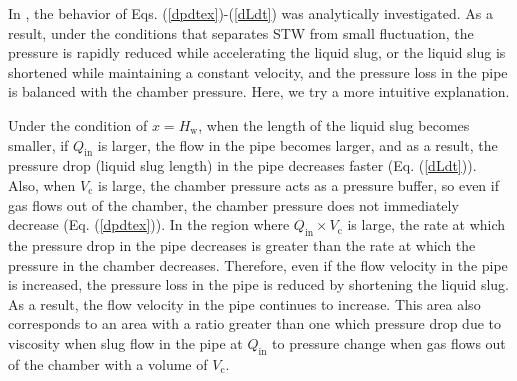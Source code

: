 \documentclass[aps,pre,preprint,groupedaddress,showkeys]{revtex4-2}
\begin{document}
In \cite{kanno2018}, the behavior of Eqs. (\ref{dpdtex})-(\ref{dLdt}) was analytically investigated.
As a result, under the conditions that separates STW from small fluctuation, the pressure is rapidly reduced while accelerating the liquid slug, or the liquid slug is shortened while maintaining a constant velocity, and the pressure loss in the pipe is balanced with the chamber pressure.
Here, we try a more intuitive explanation.

Under the condition of $ x = H_ \mathrm{w}$, when the length of the liquid slug becomes smaller, if $ Q_ \mathrm {in}$ is larger, the flow in the pipe becomes larger, and as a result, the pressure drop (liquid slug length) in the pipe decreases faster (Eq. (\ref{dLdt})).
Also, when $ V_ \mathrm{c} $ is large, the chamber pressure acts as a pressure buffer, so even if gas flows out of the chamber, the chamber pressure does not immediately decrease (Eq. (\ref{dpdtex})).
In the region where $ Q_ \mathrm{in} \times V_ \mathrm {c} $ is large, the rate at which the pressure drop in the pipe decreases is greater than the rate at which the pressure in the chamber decreases.
Therefore, even if the flow velocity in the pipe is increased, the pressure loss in the pipe is reduced by shortening the liquid slug.
As a result, the flow velocity in the pipe continues to increase.
This area also corresponds to an area with a ratio greater than one which pressure drop due to viscosity when slug flow in the pipe at $Q_ \mathrm {in}$ to pressure change when gas flows out of the chamber with a volume of $V_\mathrm {c}$.
\end{document}

